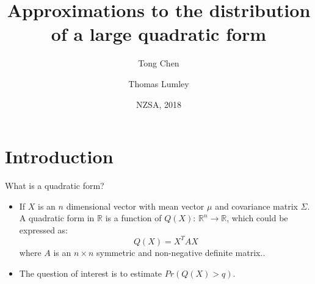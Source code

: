 \documentclass{beamer}
\title[]{
\Large{Approximations to the distribution\\ of a large quadratic form}
} %
\institute[]{Department of Statistics\\University of Auckland}
\author{Tong Chen \and Thomas Lumley}
\date{NZSA, 2018} %
\begin{document}
\begin{frame}
\titlepage %
\end{frame}



\section{Introduction}

\begin{frame}{What is a quadratic form?}
\begin{center}
  \begin{itemize}
  \item{If $X$ is an $n$ dimensional vector with mean vector $\mu$ and covariance matrix $\Sigma$. A quadratic form in $\mathbb{R}$ is a function of ${Q(X)}$: $\mathbb{R}^n \to \mathbb{R}$, which could be expressed as:
	\[ Q(X) = X^{T}AX\]
	where $A$ is an $n \times n$ symmetric and non-negative definite matrix..}
  \bigskip
  \item The question of interest is to estimate $Pr(Q(X)>q)$.
  \end{itemize}
\end{center}
\end{frame}


\end{document}
